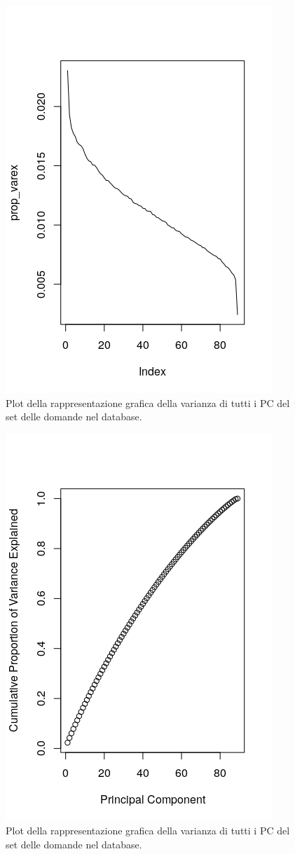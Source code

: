 \begin{figure}[H]
\centering
	\includegraphics[width=0.60\linewidth]{../../PCA/plot/variances-ALL_rete-db.png}
	\caption{Plot della rappresentazione grafica della varianza di tutti i PC del set delle domande nel database.}
	\label{Plot della rappresentazione grafica della varianza, di tutti i PC, del set delle domande nel database.}
\end{figure}
\begin{figure}[H]
\centering
	\includegraphics[width=0.60\linewidth]{../../PCA/plot/variances2-ALL_rete-db.png}
	\caption{Plot della rappresentazione grafica della varianza di tutti i PC del set delle domande nel database.}
	\label{Plot della rappresentazione grafica della varianza, di tutti i PC, del set delle domande nel database.}
\end{figure}
